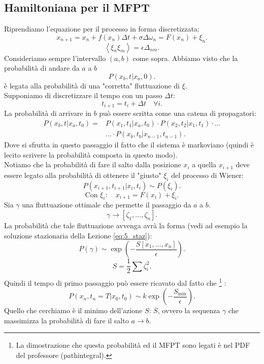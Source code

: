 \subsection{Hamiltoniana per il MFPT}%
\label{sub:Hamiltoniana per il MFPT}
Riprendiamo l'equazione per il processo in forma discretizzata:
\[
    x_{n+1} = x_n + f(x_n) \Delta t + \sigma \Delta\omega_n = F(x_n) + \xi_n
.\] 
\[
    \left<\xi_n\xi_m\right> = \epsilon\Delta_{nm}
.\] 
Consideriamo sempre l'intervallo $(a,b)$ come sopra. Abbiamo visto che la probabilità di andare da $a$ a $b$ 
\[
    P\left(x_b,t|x_a,0\right)
.\] 
è legata alla probabilità di una "corretta" fluttuazione di $\xi$. \\
Supponiamo di discretizzare il tempo con un passo $\Delta t$:
\[
    t_{i+1} = t_i + \Delta t 	\quad \forall i
.\] 
La probabilità di arrivare in $b$ può essere scritta come una catena di propagatori:
\[\begin{aligned}
    P\left(x_b,t|x_a,t_0\right)=&P\left(x_1,t_1|x_a,t_0\right)\cdot P\left(x_2,t_2|x_1,t_1\right)\cdot \ldots \\
				&\ldots \cdot P\left(x_b,t_b|x_{n-1},t_{n-1}\right)
.\end{aligned}\]
Dove si sfrutta in questo passaggio il fatto che il sistema è markoviano (quindi è lecito scrivere la probabilità composta in questo modo).\\
Notiamo che la probabilità di fare il salto dalla posizione $x_{i}$ a quella $x_{i+1}$ deve essere legato alla probabilità di ottenere il "giusto" $\xi_i$  del processo di Wiener:
\[
    P\left(x_{i+1}, t_{i+1}|x_i,t_i\right) \sim P(\xi_i) 
.\] 
\[
    \text{Con } \xi_i: \quad x_{i+1} = F(x_i) + \xi_i
.\] 
Sia $\gamma$ una fluttuazione ottimale che permette il passaggio da $a$ a $b$.
\[
	\gamma \to \left[\zeta_1, \ldots, \zeta_n\right]
.\] 
La probabilità che tale fluttuazione avvenga avrà la forma (vedi ad esempio la soluzione stazionaria della Lezione \ref{eq:5_staz}):
\[
    P(\gamma) \sim \exp\left(-\frac{S\left[x_1,\ldots,x_n\right]}{\epsilon}\right)
.\] 
\[
    S = \frac{1}{2}\sum_{}^{} \zeta^2_i
.\] 
Quindi il tempo di primo passaggio può essere ricavato dal fatto che
\footnote{La dimostrazione che questa probabilità ed il MFPT sono legati è nel PDF del professore (pathintegral).}
:
\[
    P\left(x_n,t_n = T|x_0,t_0\right) \sim k \exp\left(-\frac{S_{\text{min}}}{\epsilon}\right)
.\] 
Quello che cerchiamo è il minimo dell'azione $S$: $\overline{S}$, ovvero la sequenza $\gamma$ che massimizza la probabilità di fare il salto $a\to b$.\\
